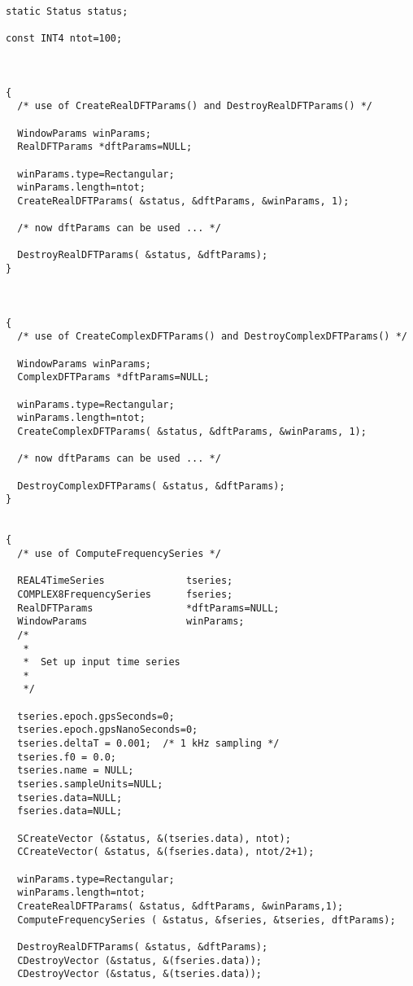 \documentclass{article}
\begin{document}

\begin{verbatim}

static Status status;

const INT4 ntot=100;



{
  /* use of CreateRealDFTParams() and DestroyRealDFTParams() */

  WindowParams winParams;
  RealDFTParams *dftParams=NULL;

  winParams.type=Rectangular;
  winParams.length=ntot;
  CreateRealDFTParams( &status, &dftParams, &winParams, 1);

  /* now dftParams can be used ... */

  DestroyRealDFTParams( &status, &dftParams);
}



{
  /* use of CreateComplexDFTParams() and DestroyComplexDFTParams() */

  WindowParams winParams;
  ComplexDFTParams *dftParams=NULL;

  winParams.type=Rectangular;
  winParams.length=ntot;
  CreateComplexDFTParams( &status, &dftParams, &winParams, 1);

  /* now dftParams can be used ... */

  DestroyComplexDFTParams( &status, &dftParams);
}


{
  /* use of ComputeFrequencySeries */

  REAL4TimeSeries              tseries;
  COMPLEX8FrequencySeries      fseries;
  RealDFTParams                *dftParams=NULL;
  WindowParams                 winParams;
  /* 
   *  
   *  Set up input time series
   *
   */

  tseries.epoch.gpsSeconds=0;
  tseries.epoch.gpsNanoSeconds=0;
  tseries.deltaT = 0.001;  /* 1 kHz sampling */
  tseries.f0 = 0.0;
  tseries.name = NULL;
  tseries.sampleUnits=NULL;
  tseries.data=NULL;
  fseries.data=NULL;

  SCreateVector (&status, &(tseries.data), ntot);
  CCreateVector( &status, &(fseries.data), ntot/2+1);

  winParams.type=Rectangular;
  winParams.length=ntot;
  CreateRealDFTParams( &status, &dftParams, &winParams,1);
  ComputeFrequencySeries ( &status, &fseries, &tseries, dftParams);

  DestroyRealDFTParams( &status, &dftParams);
  CDestroyVector (&status, &(fseries.data));
  CDestroyVector (&status, &(tseries.data));


\end{verbatim}
\end{document}
